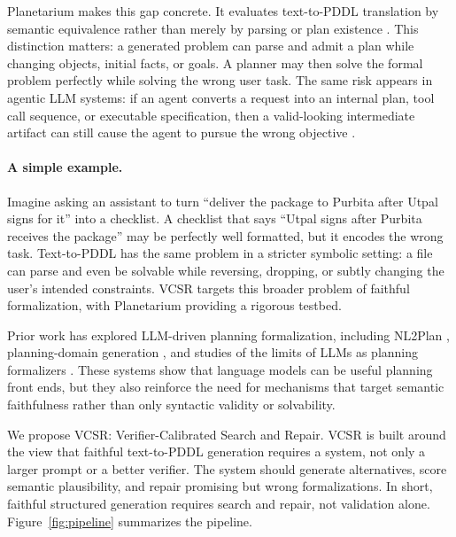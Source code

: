 \documentclass[11pt]{article}
\newcommand{\vcsr}{\textsc{VCSR}\xspace}
\newcommand{\pddl}{\textsc{PDDL}\xspace}
\begin{document}
Planetarium makes this gap concrete. It evaluates text-to-\pddl translation by
semantic equivalence rather than merely by parsing or plan existence
\citep{zuo2024planetarium}. This distinction matters: a generated problem can
parse and admit a plan while changing objects, initial facts, or goals. A
planner may then solve the formal problem perfectly while solving the wrong
user task. The same risk appears in agentic LLM systems: if an agent converts a
request into an internal plan, tool call sequence, or executable specification,
then a valid-looking intermediate artifact can still cause the agent to pursue
the wrong objective \citep{yao2023react,schick2023toolformer}.

\paragraph{A simple example.}
Imagine asking an assistant to turn ``deliver the package to Purbita after Utpal
signs for it'' into a checklist. A checklist that says ``Utpal signs after Purbita
receives the package'' may be perfectly well formatted, but it encodes the wrong
task. Text-to-\pddl has the same problem in a stricter symbolic setting: a file
can parse and even be solvable while reversing, dropping, or subtly changing
the user's intended constraints. \vcsr targets this broader problem of
faithful formalization, with Planetarium providing a rigorous testbed.

Prior work has explored LLM-driven planning formalization, including NL2Plan
\citep{gestrin2024nl2plan}, planning-domain generation
\citep{oswald2024planningdomains}, and studies of the limits of LLMs as
planning formalizers \citep{huang2024planningformalizers}. These systems show
that language models can be useful planning front ends, but they also reinforce
the need for mechanisms that target semantic faithfulness rather than only
syntactic validity or solvability.

We propose \vcsr: Verifier-Calibrated Search and Repair. \vcsr is built around
the view that faithful text-to-\pddl generation requires a system, not only a
larger prompt or a better verifier. The system should generate alternatives,
score semantic plausibility, and repair promising but wrong formalizations.
In short, faithful structured generation requires search and repair, not
validation alone.
Figure~\ref{fig:pipeline} summarizes the pipeline.
\end{document}
